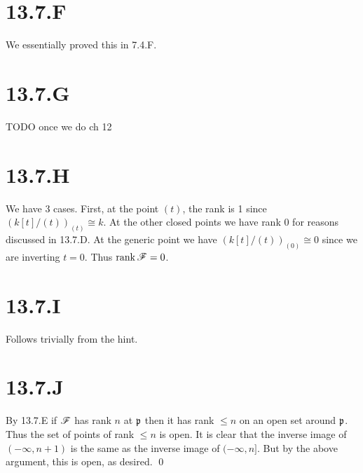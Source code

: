 \documentclass{article}
\begin{document}
\section*{13.7.F}
We essentially proved this in 7.4.F.

\section*{13.7.G}
TODO once we do ch 12

\section*{13.7.H}
We have 3 cases. First, at the point $(t)$, the rank is 1
since $(k[t]/(t))_{(t)}
    \cong k$. At the other closed points we have rank 0 for
reasons discussed in 13.7.D. At the generic point we have
$(k[t]/(t))_{(0)}
    \cong 0$ since we are inverting $t=0$. Thus
$\operatorname{rank} \operatorname{\mathscr{F}} = 0$.

\section*{13.7.I}
Follows trivially from the hint.

\section*{13.7.J}
By 13.7.E if $\operatorname{\mathscr{F}}$ has rank $n$ at
$\mathfrak{p}$ then it has rank $\leq n$ on an open set
around $\mathfrak{p}$. Thus the set of points of rank
$\leq n$ is open. It is clear that the inverse image of
$(-\infty, n+1)$ is the same as the inverse image of
$(-\infty, n]$. But by the above argument, this is open, as desired.
\qed
\end{document}
